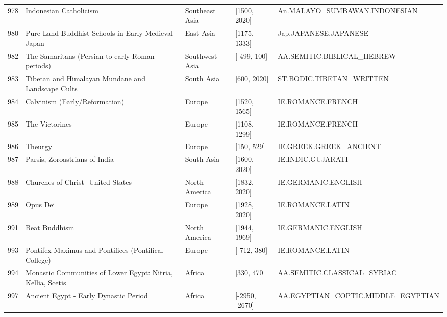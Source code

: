 {\begin{longtable}{rp{3.5cm}llp{3.5cm}}
978 & {\raggedright Indonesian Catholicism} & Southeast Asia & [1500, 2020] & {\raggedright An.\allowbreak{}MALAYO\_\allowbreak{}SUMBAWAN.\allowbreak{}INDONESIAN} \\
980 & {\raggedright Pure Land Buddhist Schools in Early Medieval Japan} & East Asia & [1175, 1333] & {\raggedright Jap.\allowbreak{}JAPANESE.\allowbreak{}JAPANESE} \\
982 & {\raggedright The Samaritans (Persian to early Roman periods)} & Southwest Asia & [-499, 100] & {\raggedright AA.\allowbreak{}SEMITIC.\allowbreak{}BIBLICAL\_\allowbreak{}HEBREW} \\
983 & {\raggedright Tibetan and Himalayan Mundane and Landscape Cults} & South Asia & [600, 2020] & {\raggedright ST.\allowbreak{}BODIC.\allowbreak{}TIBETAN\_\allowbreak{}WRITTEN} \\
984 & {\raggedright Calvinism (Early/Reformation)} & Europe & [1520, 1565] & {\raggedright IE.\allowbreak{}ROMANCE.\allowbreak{}FRENCH} \\
985 & {\raggedright The Victorines} & Europe & [1108, 1299] & {\raggedright IE.\allowbreak{}ROMANCE.\allowbreak{}FRENCH} \\
986 & {\raggedright Theurgy} & Europe & [150, 529] & {\raggedright IE.\allowbreak{}GREEK.\allowbreak{}GREEK\_\allowbreak{}ANCIENT} \\
987 & {\raggedright Parsis, Zoroastrians of India} & South Asia & [1600, 2020] & {\raggedright IE.\allowbreak{}INDIC.\allowbreak{}GUJARATI} \\
988 & {\raggedright Churches of Christ- United States} & North America & [1832, 2020] & {\raggedright IE.\allowbreak{}GERMANIC.\allowbreak{}ENGLISH} \\
989 & {\raggedright Opus Dei} & Europe & [1928, 2020] & {\raggedright IE.\allowbreak{}ROMANCE.\allowbreak{}LATIN} \\
991 & {\raggedright Beat Buddhism} & North America & [1944, 1969] & {\raggedright IE.\allowbreak{}GERMANIC.\allowbreak{}ENGLISH} \\
993 & {\raggedright Pontifex Maximus and Pontifices (Pontifical College)} & Europe & [-712, 380] & {\raggedright IE.\allowbreak{}ROMANCE.\allowbreak{}LATIN} \\
994 & {\raggedright Monastic Communities of Lower Egypt: Nitria, Kellia, Scetis} & Africa & [330, 470] & {\raggedright AA.\allowbreak{}SEMITIC.\allowbreak{}CLASSICAL\_\allowbreak{}SYRIAC} \\
997 & {\raggedright Ancient Egypt - Early Dynastic Period} & Africa & [-2950, -2670] & {\raggedright AA.\allowbreak{}EGYPTIAN\_\allowbreak{}COPTIC.\allowbreak{}MIDDLE\_\allowbreak{}EGYPTIAN} \\

\end{longtable}}
